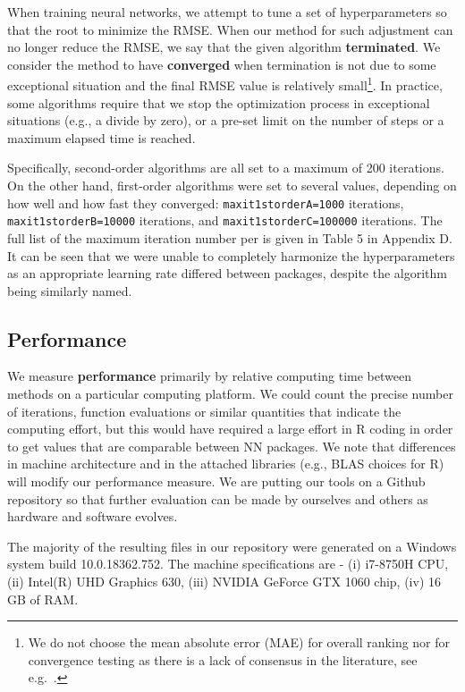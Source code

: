 When training neural networks, we attempt to tune a set of
hyperparameters so that the root to minimize the RMSE. When our method
for such adjustment can no longer reduce the RMSE, we say that the given
algorithm \textbf{terminated}. We consider the method to have
\textbf{converged} when termination is not due to some exceptional
situation and the final RMSE value is relatively small\footnote{We do
  not choose the mean absolute error (MAE) for overall ranking nor for
  convergence testing as there is a lack of consensus in the literature,
  see e.g.~\citep{willmott2005advantages,chai2014root}.}. In practice,
some algorithms require that we stop the optimization process in
exceptional situations (e.g., a divide by zero), or a pre-set limit on
the number of steps or a maximum elapsed time is reached.

Specifically, second-order algorithms are all set to a maximum of 200
iterations. On the other hand, first-order algorithms were set to
several values, depending on how well and how fast they converged:
\texttt{maxit1storderA=1000} iterations, \texttt{maxit1storderB=10000}
iterations, and \texttt{maxit1storderC=100000} iterations. The full list
of the maximum iteration number per  is given in
Table 5 in Appendix D. It can be seen that we were unable to completely
harmonize the hyperparameters as an appropriate learning rate differed
between packages, despite the algorithm being similarly named.

\hypertarget{performance}{%
\subsection{Performance}\label{performance}}

We measure \textbf{performance} primarily by relative computing time
between methods on a particular computing platform. We could count the
precise number of iterations, function evaluations or similar quantities
that indicate the computing effort, but this would have required a large
effort in R coding in order to get values that are comparable between NN
packages. We note that differences in machine architecture and in the
attached libraries (e.g., BLAS choices for \textsf{R}) will modify our
performance measure. We are putting our tools on a Github repository so
that further evaluation can be made by ourselves and others as hardware
and software evolves.

The majority of the resulting files in our repository were generated on
a Windows system build 10.0.18362.752. The machine specifications are -
(i) i7-8750H CPU, (ii) Intel(R) UHD Graphics 630, (iii) NVIDIA GeForce
GTX 1060 chip, (iv) 16 GB of RAM.


